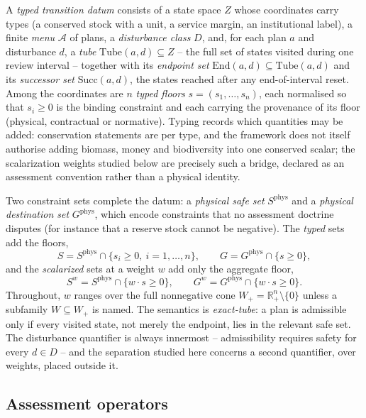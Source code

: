 \documentclass[preprint,11pt,authoryear]{elsarticle}
\theoremstyle{definition}
\theoremstyle{remark}
\newcommand{\Wp}{W_+}
\newcommand{\Tube}{\mathrm{Tube}}
\newcommand{\Succ}{\mathrm{Succ}}
\newcommand{\End}{\mathrm{End}}
\newcommand{\Rp}{\mathbb{R}^n_+}
\begin{document}
A \emph{typed transition datum} consists of a state space $Z$ whose coordinates carry types (a conserved stock with a unit, a service margin, an institutional label), a finite \emph{menu} $\mathcal A$ of plans, a \emph{disturbance class} $D$, and, for each plan $a$ and disturbance $d$, a \emph{tube} $\Tube(a,d)\subseteq Z$ -- the full set of states visited during one review interval -- together with its \emph{endpoint set} $\End(a,d)\subseteq\Tube(a,d)$ and its \emph{successor set} $\Succ(a,d)$, the states reached after any end-of-interval reset. Among the coordinates are $n$ \emph{typed floors} $s=(s_1,\dots,s_n)$, each normalised so that $s_i\ge0$ is the binding constraint and each carrying the provenance of its floor (physical, contractual or normative). Typing records which quantities may be added: conservation statements are per type, and the framework does not itself authorise adding biomass, money and biodiversity into one conserved scalar; the scalarization weights studied below are precisely such a bridge, declared as an assessment convention rather than a physical identity.

Two constraint sets complete the datum: a \emph{physical safe set} $S^{\mathrm{phys}}$ and a \emph{physical destination set} $G^{\mathrm{phys}}$, which encode constraints that no assessment doctrine disputes (for instance that a reserve stock cannot be negative). The \emph{typed} sets add the floors,
\[
S=S^{\mathrm{phys}}\cap\{s_i\ge0,\ i=1,\dots,n\},\qquad G=G^{\mathrm{phys}}\cap\{s\ge0\},
\]
and the \emph{scalarized} sets at a weight $w$ add only the aggregate floor,
\[
S^w=S^{\mathrm{phys}}\cap\{w\cdot s\ge0\},\qquad G^w=G^{\mathrm{phys}}\cap\{w\cdot s\ge0\}.
\]
Throughout, $w$ ranges over the full nonnegative cone $\Wp=\Rp\setminus\{0\}$ unless a subfamily $W\subseteq\Wp$ is named. The semantics is \emph{exact-tube}: a plan is admissible only if every visited state, not merely the endpoint, lies in the relevant safe set. The disturbance quantifier is always innermost -- admissibility requires safety for every $d\in D$ -- and the separation studied here concerns a second quantifier, over weights, placed outside it.

\subsection{Assessment operators}
\end{document}
